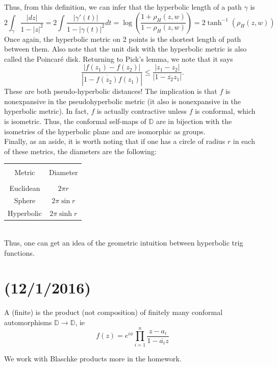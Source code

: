 \documentclass[11pt,leqno,oneside]{amsart}
\numberwithin{thm}{section}
\newcommand{\D}{\mathbb{D}}
\begin{document}
  Thus, from this definition, we can infer that the hyperbolic length
  of a path $\gamma$ is \[
    2\int_\gamma \frac{|dz|}{1-|z|^2} = 2 \int
    \frac{|\gamma'(t)|}{1-|\gamma(t)|^2}dt = \log \left(
      \frac{1+\rho_H(z,w)}{1-\rho_H(z,w)} \right) = 2 \tanh^{-1}(\rho_H(z,w))
  \]
  Once again, the hyperbolic metric on 2 points is the shortest length
  of path between them. Also note that the unit disk with the
  hyperbolic metric is also called the Poincar\'{e} disk. Returning to
  Pick's lemma, we note that it says \[
    \frac{|f(z_1)-f(z_2)|}{|1-\overline{f(z_2)}f(z_1)|} \leq \frac{|z_1-z_2|}{|1-\overline{z_2}z_1|}.
  \]
  These are both pseudo-hyperbolic distances! The implication is that
  $f$ is nonexpansive in the pseudohyperbolic metric (it also is
  nonexpansive in the hyperbolic metric). In fact, $f$ is actually
  contractive unless $f$ is conformal, which is isometric. Thus, the
  conformal self-maps of $\D$ are in bijection with the isometries of
  the hyperbolic plane and are isomorphic as groups. \\

  Finally, as an aside, it is worth noting that if one has a circle of
  radius $r$ in each of these metrics, the diameters are the
  following: \\
  \begin{tabular}{|c|c|}
    \hline &\\
    Metric & Diameter \\
    \hline &\\
    Euclidean & $2 \pi r$ \\
    Sphere & $2 \pi \sin r$ \\
    Hyperbolic & $2 \pi \sinh r$ \\
    \hline
  \end{tabular} \\
  Thus, one can get an idea of the geometric intuition between
  hyperbolic trig functions.
  \section{(12/1/2016)}
  \begin{defn}
    A (finite)  is the product (not
    composition) of finitely many conformal automorphisms $\D \to
    \D$, ie \[
      f(z) = e^{i\phi} \prod_{i=1}^n \frac{z-a_i}{1-\overline{a_i}z}
    \]
  \end{defn}
  We work with Blaschke products more in the homework. \\
\end{document}
